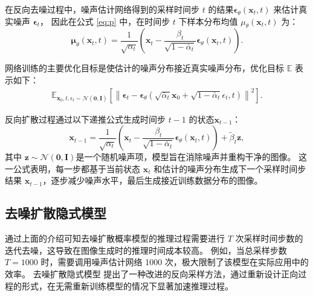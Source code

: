 在反向去噪过程中，噪声估计网络得到的采样时间步 $t$ 的结果$\boldsymbol{\epsilon}_\theta\left(\mathbf{x}_t, t\right)$ 来估计真实噪声 $\boldsymbol{\epsilon}_t$，
因此在公式 \eqref{eq:p} 中，在时间步 $t$ 下样本分布均值 $\mu_\theta\left(\mathbf{x}_t, t\right)$ 为：
\begin{equation}
    \boldsymbol{\mu}_\theta\left(\mathbf{x}_t, t\right)=\frac{1}{\sqrt{\alpha_t}}\left(\mathbf{x}_t-\frac{\beta_t}{\sqrt{1-\bar{\alpha}_t}} \boldsymbol{\epsilon}_\theta\left(\mathbf{x}_t, t\right)\right).
\end{equation}

网络训练的主要优化目标是使估计的噪声分布接近真实噪声分布，优化目标 $\mathbb{E}$ 表示如下：
\begin{equation}
\begin{split}
    \mathbb{E}_{\mathbf{x}_0, t, \epsilon_t \sim \mathcal{N}(\mathbf{0}, \mathbf{I})}\left[\left\|\boldsymbol{\epsilon}_t -\boldsymbol{\epsilon}_\theta\left(\sqrt{\bar{\alpha}_t} \mathbf{x}_0+\sqrt{1-\bar{\alpha}_t} \epsilon_t, t\right)\right\|^2\right].
\end{split}
\end{equation}

反向扩散过程通过以下递推公式生成时间步 $t-1$ 的状态$\mathbf{x}_{t-1}$：
\begin{equation}
    \mathbf{x}_{t-1}=\frac{1}{\sqrt{\alpha_t}}\left(\mathbf{x}_t-\frac{\beta_t}{\sqrt{1-\bar{\alpha}_t}} \boldsymbol{\epsilon}_\theta\left(\mathbf{x}_t, t\right)\right)+\tilde{\beta}_t \boldsymbol{z},
\end{equation}
其中 $\boldsymbol{z} \sim \mathcal{N}(\mathbf{0}, \mathbf{I})$是一个随机噪声项，模型旨在消除噪声并重构干净的图像。
这一公式表明，每一步都基于当前状态 $\mathbf{x}_t$ 和估计的噪声分布生成下一个采样时间步结果 $\mathbf{x}_{t-1}$，逐步减少噪声水平，最后生成接近训练数据分布的图像。

\subsection{去噪扩散隐式模型}
通过上面的介绍可知去噪扩散概率模型的推理过程需要进行 $T$ 次采样时间步数的迭代去噪，这导致在图像生成时的推理时间成本较高。
例如，当总采样步数 $T=1000$ 时，需要调用噪声估计网络 1000 次，极大限制了该模型在实际应用中的效率。
去噪扩散隐式模型\cite{improved_ddpm}\cite{ddim} 提出了一种改进的反向采样方法，通过重新设计正向过程的形式，在无需重新训练模型的情况下显著加速推理过程。

